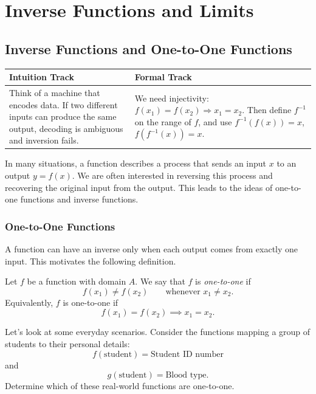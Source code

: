 \chapter{Inverse Functions and Limits}

\section{Inverse Functions and One-to-One Functions}

\begin{center}
\renewcommand{\arraystretch}{1.2}
\begin{tabular}{|p{}|p{}|}
\hline
\textbf{Intuition Track} & \textbf{Formal Track} \\
\hline
Think of a machine that encodes data. If two different inputs can produce the same output, decoding is ambiguous and inversion fails. & We need injectivity: \(f(x_1)=f(x_2)\Rightarrow x_1=x_2\). Then define \(f^{-1}\) on the range of \(f\), and use \(f^{-1}(f(x))=x\), \(f(f^{-1}(x))=x\). \\
\hline
\end{tabular}
\end{center}

In many situations, a function describes a process that sends an input \(x\) to an output \(y=f(x)\). We are often interested in reversing this process and recovering the original input from the output. This leads to the ideas of one-to-one functions and inverse functions.

\subsection{One-to-One Functions}

A function can have an inverse only when each output comes from exactly one input. This motivates the following definition.

\begin{definition}
Let \(f\) be a function with domain \(A\). We say that \(f\) is \emph{one-to-one} if
\[
f(x_1)\ne f(x_2)
\qquad \text{whenever } x_1\ne x_2.
\]
Equivalently, \(f\) is one-to-one if
\[
f(x_1)=f(x_2) \implies x_1=x_2.
\]
\end{definition}

\begin{example}
Let's look at some everyday scenarios. Consider the functions mapping a group of students to their personal details:
\[
f(\text{student})=\text{Student ID number}
\]
and
\[
g(\text{student})=\text{Blood type}.
\]
Determine which of these real-world functions are one-to-one.
\end{example}

